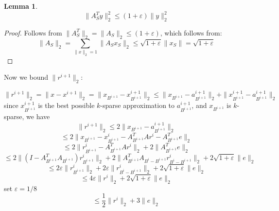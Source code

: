 \documentclass[11pt]{article}
\newtheorem{lemma}[theorem]{Lemma}
\begin{document}
\begin{lemma}
$$\|A^T_S y\|_2^2 \le (1+\varepsilon)\|y\|_2^2$$
\end{lemma}
\begin{proof}
Follows from $\|A_S^T\|_2 = \|A_S\|_2 \le (1+\varepsilon)$, which follows from:
$$\|A_S\|_2 = \sum_{\|x\|_2 = 1} \|A_S x_S\|_2 \le \sqrt{1+\varepsilon} \|x_S\| = \sqrt{1+\varepsilon}$$
\end{proof}


Now we bound $\|r^{i+1}\|_2$:

$$\|r^{i+1}\|_2 = \|x-x^{i+1}\|_2 = \|x_{B^{i+1}} - x^{i+1}_{B^{i+1}}\|_2 \le  \|x_{B^{i+1}} - a^{i+1}_{B^{i+1}}\|_2 + \|x^{i+1}_{B^{i+1}} - a^{i+1}_{B^{i+1}}\|_2$$
since $x^{i+1}_{B^{i+1}}$ is the best possible $k$-sparse approximation to $a^{i+1}_{B^{i+1}}$, and $x_{B^{i+1}}$ is $k$-sparse, we have
$$\|r^{i+1}\|_2 \le 2 \|x_{B^{i+1}} - a^{i+1}_{B^{i+1}}\|_2 $$
$$\le 2\|x_{B^{i+1}} - x^i_{B^{i+1}} - A^T_{B^{i+1}} A r^i  - A^T_{B^{i+1}} e\|_2$$
$$\le 2\|r^i_{B^{i+1}} - A^T_{B^{i+1}} A r^i \|_2 + 2 \|A^T_{B^{i+1}} e\|_2$$
$$\le 2\|(I - A^T_{B^{i+1}}A_{B^{i+1}})r^i_{B^{i+1}}\|_2  + 2 \|A^T_{B^{i+1}} A_{B^i-B^{i+1}} r^i_{B^i-B^{i+1}} \|_2+ 2 \sqrt{1+\varepsilon}\| e\|_2$$
$$\le 2\varepsilon\|r^i_{B^{i+1}}\|_2  + 2 \varepsilon\| r^i_{B^i-B^{i+1}} \|_2 + 2 \sqrt{1+\varepsilon}\| e\|_2$$
$$\le 4\varepsilon\|r^i\|_2 + 2 \sqrt{1+\varepsilon}\| e\|_2$$
set $\varepsilon = 1/8$
$$\le \frac12\|r^i\|_2 + 3\|e\|_2$$
\end{document}
